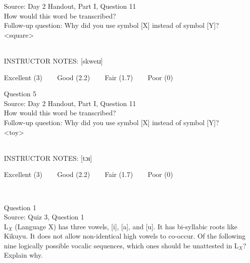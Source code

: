 \documentclass[12pt]{article}
\begin{document}
Source: Day 2 Handout, Part I, Question 11\\

How would this word be transcribed?\\ Follow-up question: Why did you use symbol [X] instead of symbol [Y]?\\

<square>


~\\
INSTRUCTOR NOTES: [skweɪɹ]


\vfill
Excellent (3) ~~~ Good (2.2) ~~~ Fair (1.7) ~~~ Poor (0)
\newpage

{\large Question 5}\\

Source: Day 2 Handout, Part I, Question 11\\

How would this word be transcribed?\\ Follow-up question: Why did you use symbol [X] instead of symbol [Y]?\\

<toy>


~\\
INSTRUCTOR NOTES: [tɔɪ]


\vfill
Excellent (3) ~~~ Good (2.2) ~~~ Fair (1.7) ~~~ Poor (0)
\newpage

\begin{center}
\textbf{{\color{red}{\HUGE END OF EXAM}}}\\

\end{center}
\newpage

\begin{center}
\textbf{{\color{blue}{\HUGE START OF EXAM\\}}}

\textbf{{\color{blue}{\HUGE Student ID: 8079\\}}}

\textbf{{\color{blue}{\HUGE 12:00 noon - 12:15 PM\\}}}

\end{center}
\newpage

{\large Question 1}\\

Source: Quiz 3, Question 1\\

L$_X$ (Language X) has three vowels, [i], [a], and [u]. It has bi-syllabic roots like Kikuyu. It does not allow non-identical high vowels to co-occur. Of the following nine logically possible vocalic sequences, which ones should be unattested in L$_X$? Explain why.\\
\end{document}
